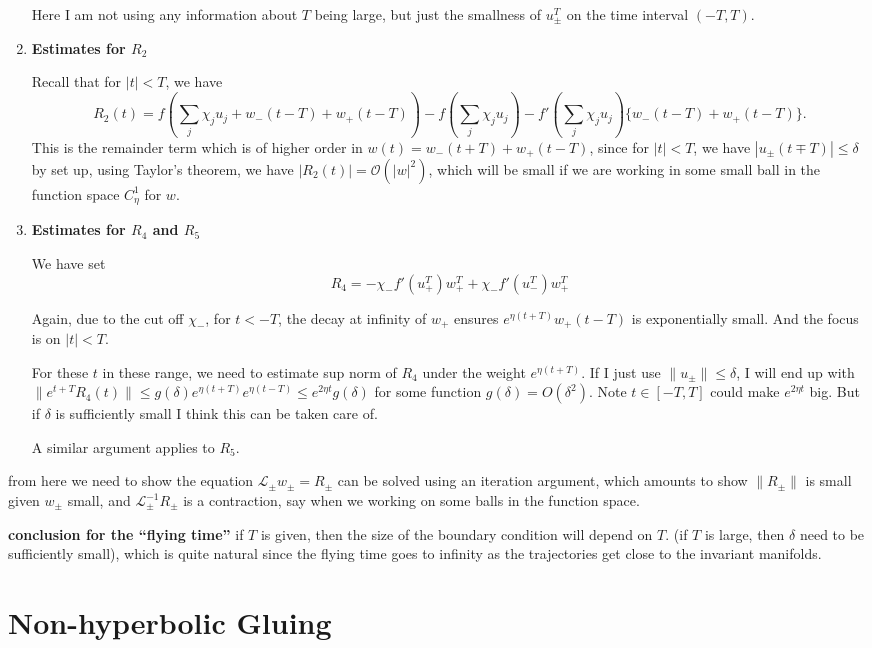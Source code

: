 \documentclass[letterpaper,11pt]{article}
\newcommand{\rmO}{\mathcal{O}}
\numberwithin{equation}{section}
\theoremstyle{plain}
\begin{document}
\begin{enumerate}
Here I am not using any information about $T$ being large, but just the smallness of $u_{\pm}^T$ on the time interval $(-T,T)$.
\item  \textbf{Estimates for $R_2$}

Recall that for $|t|<T$, we have
\[
R_2(t)= f(\sum_j \chi_ju_j+w_-(t-T)+w_+(t-T))-f(\sum_j \chi_j u_j)-f'\left(\sum_j \chi_ju_j\right) \{w_-(t-T)+w_+(t-T)\}.
\]
This is the remainder term which is of higher order in  $w(t)=w_-(t+T)+w_+(t-T)$, since for $|t|<T$, we have $|u_\pm(t\mp T)|\le \delta$ by set up, using Taylor's theorem, we have $|R_2(t)| = \rmO(|w|^2)$, which will be small if we are working in some small ball in the function space $C^1_\eta$ for $w$.
\item \textbf{Estimates for $R_4$ and $R_5$}

We have set
\[
R_4 = -  \chi_-f'(u^T_+)w^T_+ + \chi_-f'(u^T_-)w^T_+ 
\] 

Again, due to the cut off $\chi_-$, for $t<-T$, the decay at infinity of $w_+$ ensures $e^{\eta(t+T)}w_+(t-T)$ is exponentially small. And the focus is on $|t|<T$.

For these $t$ in these range, we need to estimate sup norm of $R_4$ under the weight $e^{\eta(t+T)}$. If I just use $\|u_\pm\|\le \delta$, I will end up with
$\|e^{t+T}R_4(t)\| \le g(\delta) e^{\eta(t+T)}e^{\eta(t-T)} \le e^{2\eta t} g(\delta)$ for some function $g(\delta) = O(\delta^2)$. Note $t\in [-T,T]$ could make $e^{2\eta t}$ big. But if $\delta$ is sufficiently small I think this can be taken care of.

A similar argument applies to $R_5$.

\end{enumerate}
from here we need to show the equation $\mathcal{L}_\pm w_\pm = R_\pm$ can be solved using an iteration argument, which amounts to show $\|R_\pm\|$ is small given $w_\pm$ small, and $\mathcal{L}_\pm^{-1}R_\pm$ is a contraction, say when we working on some balls in the function space.



\textbf{conclusion for the ``flying time''} if $T$ is given, then the size of the boundary condition will depend on $T$. (if $T$ is large, then $\delta$ need to be sufficiently small), which is quite natural since the flying time goes to infinity as the trajectories get close to the invariant manifolds.

\pagebreak

\section{Non-hyperbolic Gluing}
\end{document}
